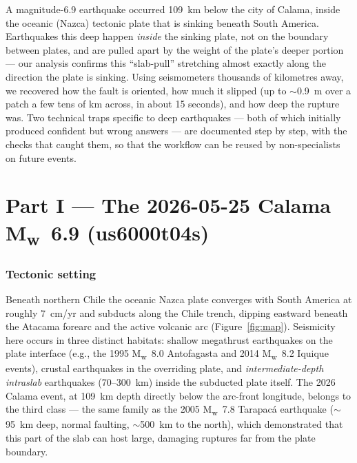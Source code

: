 \documentclass[11pt]{article}
\newcommand{\Mw}{M\textsubscript{w}}
\begin{document}
\begin{tcolorbox}[colback=gray!8,colframe=gray!60,title=\textbf{Plain-language summary}]
A magnitude-6.9 earthquake occurred 109~km below the city of Calama, inside the oceanic
(Nazca) tectonic plate that is sinking beneath South America. Earthquakes this deep happen
\emph{inside} the sinking plate, not on the boundary between plates, and are pulled apart by
the weight of the plate's deeper portion --- our analysis confirms this ``slab-pull'' stretching
almost exactly along the direction the plate is sinking. Using seismometers thousands of
kilometres away, we recovered how the fault is oriented, how much it slipped (up to
$\sim$0.9~m over a patch a few tens of km across, in about 15 seconds), and how deep the
rupture was. Two technical traps specific to deep earthquakes --- both of which initially
produced confident but wrong answers --- are documented step by step, with the checks that
caught them, so that the workflow can be reused by non-specialists on future events.
\end{tcolorbox}

\part*{Part I --- The 2026-05-25 Calama \Mw~6.9 (us6000t04s)}
\section{Tectonic setting}
Beneath northern Chile the oceanic Nazca plate converges with South America at roughly
7~cm/yr and subducts along the Chile trench, dipping eastward beneath the Atacama forearc
and the active volcanic arc (Figure~\ref{fig:map}). Seismicity here occurs in three distinct
habitats: shallow megathrust earthquakes on the plate interface (e.g., the 1995 \Mw~8.0
Antofagasta and 2014 \Mw~8.2 Iquique events), crustal earthquakes in the overriding plate, and
\emph{intermediate-depth intraslab} earthquakes (70--300~km) inside the subducted plate itself.
The 2026 Calama event, at 109~km depth directly below the arc-front longitude, belongs to the
third class --- the same family as the 2005 \Mw~7.8 Tarapac\'a earthquake ($\sim$95~km deep,
normal faulting, $\sim$500~km to the north), which demonstrated that this part of the slab can
host large, damaging ruptures far from the plate boundary.
\end{document}
